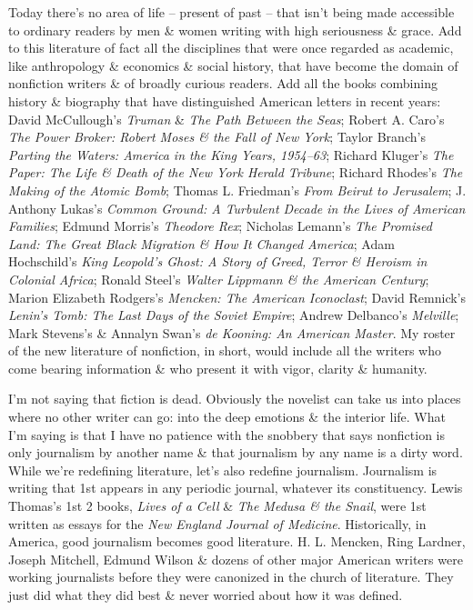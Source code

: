 \documentclass{article}
\begin{document}
Today there's no area of life -- present of past -- that isn't being made accessible to ordinary readers by men \& women writing with high seriousness \& grace. Add to this literature of fact all the disciplines that were once regarded as academic, like anthropology \& economics \& social history, that have become the domain of nonfiction writers \& of broadly curious readers. Add all the books combining history \& biography that have distinguished American letters in recent years: David McCullough's \textit{Truman} \& \textit{The Path Between the Seas}; Robert A. Caro's \textit{The Power Broker: Robert Moses \& the Fall of New York}; Taylor Branch's \textit{Parting the Waters: America in the King Years, 1954--63}; Richard Kluger's \textit{The Paper: The Life \& Death of the New York Herald Tribune}; Richard Rhodes's \textit{The Making of the Atomic Bomb}; Thomas L. Friedman's \textit{From Beirut to Jerusalem}; J. Anthony Lukas's \textit{Common Ground: A Turbulent Decade in the Lives of American Families}; Edmund Morris's \textit{Theodore Rex}; Nicholas Lemann's \textit{The Promised Land: The Great Black Migration \& How It Changed America}; Adam Hochschild's \textit{King Leopold's Ghost: A Story of Greed, Terror \& Heroism in Colonial Africa}; Ronald Steel's \textit{Walter Lippmann \& the American Century}; Marion Elizabeth Rodgers's \textit{Mencken: The American Iconoclast}; David Remnick's \textit{Lenin's Tomb: The Last Days of the Soviet Empire}; Andrew Delbanco's \textit{Melville}; Mark Stevens's \& Annalyn Swan's \textit{de Kooning: An American Master}. My roster of the new literature of nonfiction, in short, would include all the writers who come bearing information \& who present it with vigor, clarity \& humanity.

I'm not saying that fiction is dead. Obviously the novelist can take us into places where no other writer can go: into the deep emotions \& the interior life. What I'm saying is that I have no patience with the snobbery that says nonfiction is only journalism by another name \& that journalism by any name is a dirty word. While we're redefining literature, let's also redefine journalism. Journalism is writing that 1st appears in any periodic journal, whatever its constituency. Lewis Thomas's 1st 2 books, \textit{Lives of a Cell} \& \textit{The Medusa \& the Snail}, were 1st written as essays for the \textit{New England Journal of Medicine}. Historically, in America, good journalism becomes good literature. H. L. Mencken, Ring Lardner, Joseph Mitchell, Edmund Wilson \& dozens of other major American writers were working journalists before they were canonized in the church of literature. They just did what they did best \& never worried about how it was defined.
\end{document}
